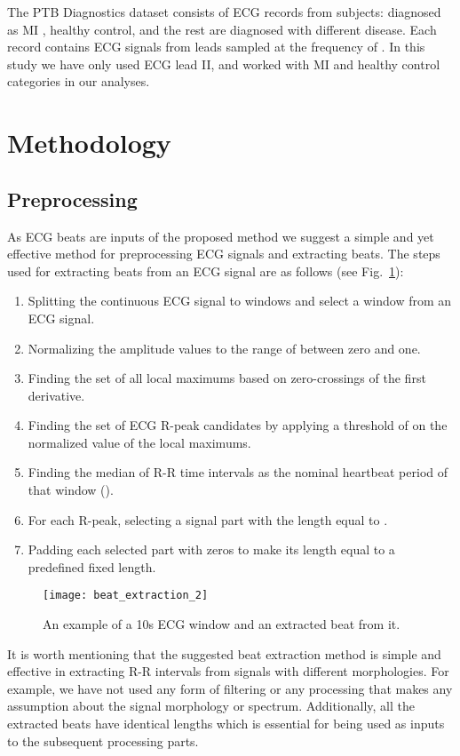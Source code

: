 \documentclass[10pt, conference, compsocconf]{IEEEtran}
\begin{document}
The PTB Diagnostics dataset consists of ECG records from  subjects:  diagnosed as MI ,  healthy control, and the rest are diagnosed with  different disease. Each record contains ECG signals from  leads sampled at the frequency of . In this study we have only used ECG lead II, and worked with MI and healthy control categories in our analyses.


\section{Methodology}
\label{sec:Methodology}


\subsection{Preprocessing}
\label{sec:Preprocessing}
As ECG beats are inputs of the proposed method we suggest a simple and yet effective method for preprocessing ECG signals and extracting beats. The steps used for extracting beats from an ECG signal are as follows (see Fig.~\ref{fig:beat_extraction}):
\begin{enumerate}
    \item Splitting the continuous ECG signal to  windows and select a  window from an ECG signal.
    \item Normalizing the amplitude values to the range of between zero and one.
    \item Finding the set of all local maximums based on zero-crossings of the first derivative.
    \item Finding the set of ECG R-peak candidates by applying a threshold of  on the normalized value of the local maximums.
    \item Finding the median of R-R time intervals as the nominal heartbeat period of that window ().
    \item For each R-peak, selecting a signal part with the length equal to .
    \item Padding each selected part with zeros to make its length equal to a predefined fixed length.
\end{enumerate}

\begin{figure}[!t]
\centering
\texttt{[image: beat\_extraction\_2]}\caption{An example of a 10s ECG window and an extracted beat from it.}
\label{fig:beat_extraction}
\end{figure}

It is worth mentioning that the suggested beat extraction method is simple and effective in extracting R-R intervals from signals with different morphologies. For example, we have not used any form of filtering or any processing that makes any assumption about the signal morphology or spectrum. Additionally, all the extracted beats have identical lengths which is essential for being used as inputs to the subsequent processing parts.
\end{document}
